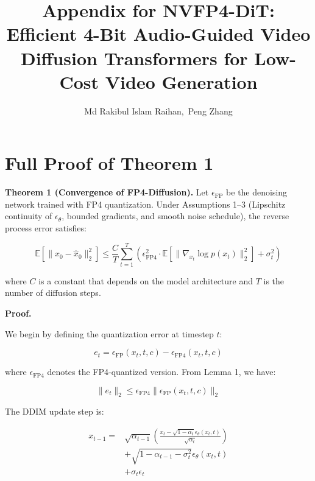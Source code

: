 \documentclass[journal,twoside]{IEEEtran}
\theoremstyle{definition}
\theoremstyle{remark}
\newcommand{\EE}{\mathbb{E}}
\begin{document}
\title{Appendix for NVFP4-DiT: Efficient 4-Bit Audio-Guided Video Diffusion Transformers for Low-Cost Video Generation}

\author{Md Rakibul Islam Raihan,~Peng Zhang}

\maketitle

\appendices

\section{Full Proof of Theorem 1}
\label{app:a}

\textbf{Theorem 1 (Convergence of FP4-Diffusion).}
Let $\epsilon_{\text{FP}}$ be the denoising network trained with FP4 quantization. Under Assumptions 1--3 (Lipschitz continuity of $\epsilon_\theta$, bounded gradients, and smooth noise schedule), the reverse process error satisfies:

\[
\EE[\|x_0 - \hat{x}_0\|_2^2] \leq \frac{C}{T} \sum_{t=1}^T \left( \epsilon_{\text{FP4}}^2 \cdot \EE[\|\nabla_{x_t} \log p(x_t)\|_2^2] + \sigma_t^2 \right)
\]

where $C$ is a constant that depends on the model architecture and $T$ is the number of diffusion steps.

\textbf{Proof.}

We begin by defining the quantization error at timestep $t$:

\[
e_t = \epsilon_{\text{FP}}(x_t, t, c) - \epsilon_{\text{FP4}}(x_t, t, c)
\]

where $\epsilon_{\text{FP4}}$ denotes the FP4-quantized version. From Lemma 1, we have:

\[
\|e_t\|_2 \leq \epsilon_{\text{FP4}} \|\epsilon_{\text{FP}}(x_t, t, c)\|_2
\]

The DDIM update step is:

\begin{equation}
\begin{split}
x_{t-1} = &\sqrt{\alpha_{t-1}} \left( \frac{x_t - \sqrt{1-\alpha_t} \epsilon_\theta(x_t, t)}{\sqrt{\alpha_t}} \right) \\
&+ \sqrt{1-\alpha_{t-1} - \sigma_t^2} \epsilon_\theta(x_t, t) \\
&+ \sigma_t \epsilon_t
\end{split}
\end{equation}
\end{document}
